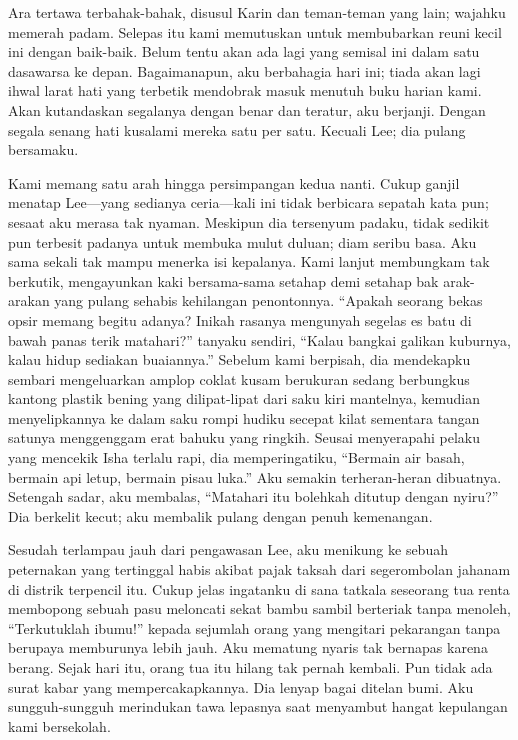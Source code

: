 \documentclass[smalldemyvopaper,11pt,twoside,onecolumn,openright,extrafontsizes]{memoir}
\begin{document}
Ara tertawa terbahak-bahak, disusul Karin dan teman-teman yang lain; wajahku memerah padam. Selepas itu kami memutuskan untuk membubarkan reuni kecil ini dengan baik-baik. Belum tentu akan ada lagi yang semisal ini dalam satu dasawarsa ke depan. Bagaimanapun, aku berbahagia hari ini; tiada akan lagi ihwal larat hati yang terbetik mendobrak masuk menutuh buku harian kami. Akan kutandaskan segalanya dengan benar dan teratur, aku berjanji. Dengan segala senang hati kusalami mereka satu per satu. Kecuali Lee; dia pulang bersamaku.

Kami memang satu arah hingga persimpangan kedua nanti. Cukup ganjil menatap Lee---yang sedianya ceria---kali ini tidak berbicara sepatah kata pun; sesaat aku merasa tak nyaman. Meskipun dia tersenyum padaku, tidak sedikit pun terbesit padanya untuk membuka mulut duluan; diam seribu basa. Aku sama sekali tak mampu menerka isi kepalanya. Kami lanjut membungkam tak berkutik, mengayunkan kaki bersama-sama setahap demi setahap bak arak-arakan yang pulang sehabis kehilangan penontonnya. ``Apakah seorang bekas opsir memang begitu adanya? Inikah rasanya mengunyah segelas es batu di bawah panas terik matahari?'' tanyaku sendiri, ``Kalau bangkai galikan kuburnya, kalau hidup sediakan buaiannya.'' Sebelum kami berpisah, dia mendekapku sembari mengeluarkan amplop coklat kusam berukuran sedang berbungkus kantong plastik bening yang dilipat-lipat dari saku kiri mantelnya, kemudian menyelipkannya ke dalam saku rompi hudiku secepat kilat sementara tangan satunya menggenggam erat bahuku yang ringkih. Seusai menyerapahi pelaku yang mencekik Isha terlalu rapi, dia memperingatiku, ``Bermain air basah, bermain api letup, bermain pisau luka.'' Aku semakin terheran-heran dibuatnya. Setengah sadar, aku membalas, ``Matahari itu bolehkah ditutup dengan nyiru?'' Dia berkelit kecut; aku membalik pulang dengan penuh kemenangan.

Sesudah terlampau jauh dari pengawasan Lee, aku menikung ke sebuah peternakan yang tertinggal habis akibat pajak taksah dari segerombolan jahanam di distrik terpencil itu. Cukup jelas ingatanku di sana tatkala seseorang tua renta membopong sebuah pasu meloncati sekat bambu sambil berteriak tanpa menoleh, ``Terkutuklah ibumu!'' kepada sejumlah orang yang mengitari pekarangan tanpa berupaya memburunya lebih jauh. Aku mematung nyaris tak bernapas karena berang. Sejak hari itu, orang tua itu hilang tak pernah kembali. Pun tidak ada surat kabar yang  mempercakapkannya. Dia lenyap bagai ditelan bumi. Aku sungguh-sungguh merindukan tawa lepasnya saat menyambut hangat kepulangan kami bersekolah.
\end{document}

